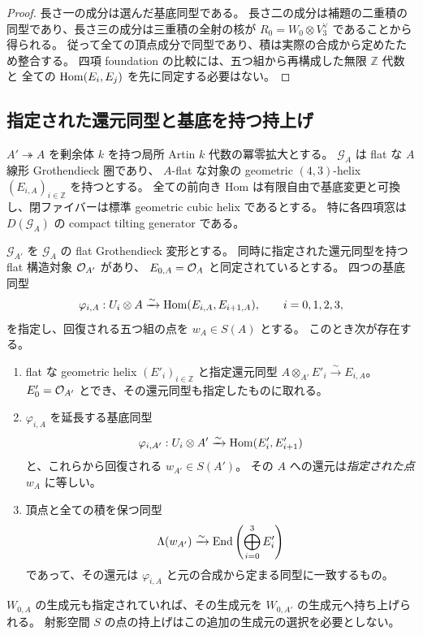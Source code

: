 \begin{proof}
長さ一の成分は選んだ基底同型である。
長さ二の成分は補題の二重積の同型であり、長さ三の成分は三重積の全射の核が
$R_0=W_0\otimes V_3^\vee$ であることから得られる。
従って全ての頂点成分で同型であり、積は実際の合成から定めたため整合する。
四項 foundation の比較には、五つ組から再構成した無限 $\mathbb Z$ 代数と
全ての $\operatorname{Hom}(E_i,E_j)$ を先に同定する必要はない。
\end{proof}

\subsection{指定された還元同型と基底を持つ持上げ}

\begin{proposition}
\label{prop:framed-cubic-artin-lift}
$A'\twoheadrightarrow A$ を剰余体 $k$ を持つ局所 Artin $k$ 代数の冪零拡大とする。
$\mathcal G_A$ は flat な $A$ 線形 Grothendieck 圏であり、
$A$-flat な対象の geometric $(4,3)$-helix $(E_{i,A})_{i\in\mathbb Z}$ を持つとする。
全ての前向き Hom は有限自由で基底変更と可換し、閉ファイバーは標準 geometric cubic helix であるとする。
特に各四項窓は $D(\mathcal G_A)$ の compact tilting generator である。

$\mathcal G_{A'}$ を $\mathcal G_A$ の flat Grothendieck 変形とする。
同時に指定された還元同型を持つ flat 構造対象 $\mathcal O_{A'}$ があり、
$E_{0,A}=\mathcal O_A$ と同定されているとする。
四つの基底同型
\[
 \varphi_{i,A}:U_i\otimes A\xrightarrow{\sim}
 \operatorname{Hom}(E_{i,A},E_{i+1,A}),\qquad i=0,1,2,3,
\]
を指定し、回復される五つ組の点を $w_A\in S(A)$ とする。
このとき次が存在する。
\begin{enumerate}
\item flat な geometric helix $(E'_{i})_{i\in\mathbb Z}$ と指定還元同型
  $A\otimes_{A'}E'_i\xrightarrow{\sim}E_{i,A}$。
  $E'_0=\mathcal O_{A'}$ とでき、その還元同型も指定したものに取れる。
\item $\varphi_{i,A}$ を延長する基底同型
\[
 \varphi_{i,A'}:U_i\otimes A'\xrightarrow{\sim}\operatorname{Hom}(E'_i,E'_{i+1})
\]
と、これらから回復される $w_{A'}\in S(A')$。
その $A$ への還元は\emph{指定された点} $w_A$ に等しい。
\item 頂点と全ての積を保つ同型
\[
 \Lambda(w_{A'})\xrightarrow{\sim}\operatorname{End}\left(\bigoplus_{i=0}^3E'_i\right)
\]
であって、その還元は $\varphi_{i,A}$ と元の合成から定まる同型に一致するもの。
\end{enumerate}
$W_{0,A}$ の生成元も指定されていれば、その生成元を $W_{0,A'}$ の生成元へ持ち上げられる。
射影空間 $S$ の点の持上げはこの追加の生成元の選択を必要としない。
\end{proposition}

